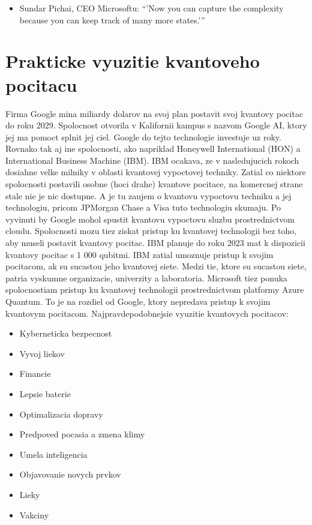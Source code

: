 \documentclass{article}
\begin{document}
\begin{itemize}
\item Sundar Pichai, CEO Microsoftu: \enquote{'Now you can capture the complexity because you can keep track of many more states.'}
\end{itemize}

\section{Prakticke vyuzitie kvantoveho pocitacu}
Firma Google mina miliardy dolarov na svoj plan postavit svoj kvantovy pocitac do roku 2029. Spolocnost otvorila v Kalifornii kampus s nazvom Google AI, ktory jej ma pomoct splnit jej ciel. Google do tejto technologie investuje uz roky. Rovnako tak aj ine spolocnosti, ako napriklad Honeywell International (HON) a International Business Machine (IBM). IBM ocakava, ze v nasledujucich rokoch dosiahne velke milniky v oblasti kvantovej vypoctovej techniky.
\bigbreak
Zatial co niektore spolocnosti postavili osobne (hoci drahe) kvantove pocitace, na komercnej strane stale nie je nic dostupne. A je tu zaujem o kvantovu vypoctovu techniku   a jej technologiu, pricom JPMorgan Chase a Visa tuto technologiu skumaju. Po vyvinuti by Google mohol spustit kvantovu vypoctovu sluzbu prostrednictvom cloudu.
\bigbreak
Spolocnosti mozu tiez ziskat pristup ku kvantovej technologii bez toho, aby museli postavit kvantovy pocitac. IBM planuje do roku 2023 mat k dispozicii kvantovy pocitac s 1 000 qubitmi. IBM zatial umoznuje pristup k svojim pocitacom, ak su sucastou jeho kvantovej siete. Medzi tie, ktore su sucastou siete, patria vyskumne organizacie, univerzity a laboratoria.
\bigbreak
Microsoft tiez ponuka spolocnostiam pristup ku kvantovej technologii prostrednictvom platformy Azure Quantum. To je na rozdiel od Google, ktory nepredava pristup k svojim kvantovym pocitacom.
\bigbreak
Najpravdepodobnejsie vyuzitie kvantovych pocitacov:
\begin{itemize}
\item Kyberneticka bezpecnost
\item Vyvoj liekov
\item Financie
\item Lepsie baterie
\item Optimalizacia dopravy
\item Predpoved pocasia a zmena klimy
\item Umela inteligencia
\item Objavovanie novych prvkov
\item Lieky
\item Vakciny
\end{itemize}
\end{document}
